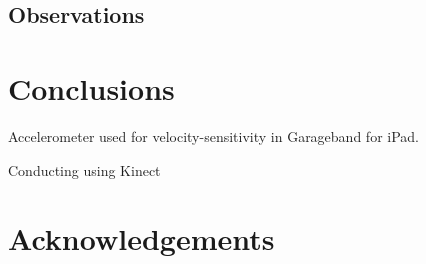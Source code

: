 \documentclass{aes130}
\begin{document}
\subsection{Observations} \label{sec:Survey2Observations}



\section{Conclusions} \label{sec:Conclusions}



Accelerometer used for velocity-sensitivity in Garageband for iPad\cite{GaragebandIpadDemo}.

Conducting using Kinect\cite{KinectConductingGameIdea}

\section{Acknowledgements} \label{sec:Acknowledgements}



\end{document}
